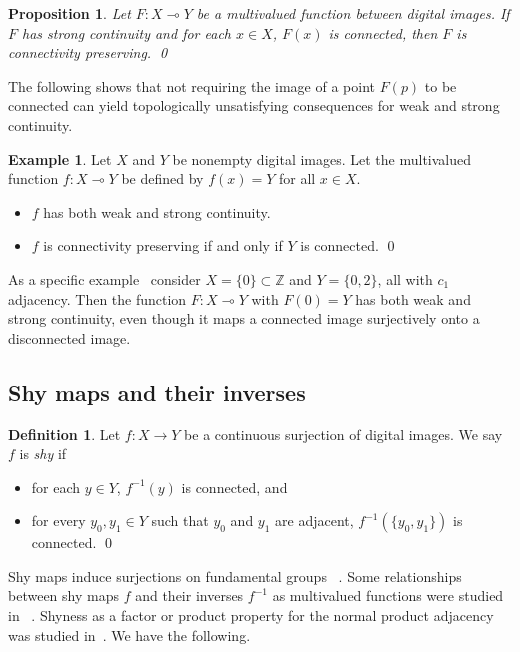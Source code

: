 \documentclass{article}
\theoremstyle{plain}
\newtheorem{prop}[thm]{Proposition}
\theoremstyle{definition}
\newtheorem{definition}[thm]{Definition}
\newtheorem{exl}[thm]{Example}
\numberwithin{thm}{section}
\def\Z{{\mathbb Z}}
\begin{document}
\begin{prop}
\rm{\cite{BoxSta16}}
Let $F: X \multimap Y$ be a multivalued function between
digital images. If $F$ has strong continuity and for
each $x \in X$, $F(x)$ is connected, then $F$ is
connectivity preserving. \qed
\end{prop}

The following shows that not requiring the image of a
point $F(p)$ to be connected can yield topologically unsatisfying 
consequences for weak and strong continuity.

\begin{exl}
\rm{\cite{BoxSta16}}
Let $X$ and $Y$ be nonempty digital images. Let
the multivalued function $f: X \multimap Y$ be defined by
$f(x)=Y$ for all $x \in X$.
\begin{itemize}
\item $f$ has both weak and strong continuity.
\item $f$ is connectivity preserving if and only if $Y$ is
      connected. \qed
\end{itemize}
\end{exl}

As a specific example~\cite{BoxSta16} consider $X= \{0\} \subset \Z$ and $Y = \{0,2\}$, all with $c_1$ adjacency. Then the function $F:X \multimap Y$ with $F(0) = Y$ has both weak and strong continuity, even though it maps a connected image surjectively onto a disconnected image.

\subsection{Shy maps and their inverses}
\begin{definition}
\label{shy-def}
\cite{Boxer05}
Let $f: X \rightarrow Y$ be a
continuous surjection of digital images. We say $f$ is
{\em shy} if
\begin{itemize}
\item for each $y \in Y$, $f^{-1}(y)$ is connected, and
\item for every $y_0,y_1 \in Y$ such that $y_0$ and $y_1$ are
      adjacent, $f^{-1}(\{y_0,y_1\})$ is
      connected. \qed
\end{itemize}
\end{definition}

Shy maps induce surjections on fundamental groups
~\cite{Boxer05}.
Some relationships between shy maps $f$ and their inverses
$f^{-1}$ as multivalued functions were studied in
~\cite{Boxer14,BoxSta16,Boxer16}.
Shyness as a factor or product property for the normal product adjacency was studied in~\cite{Boxer16a}.
We have the following.
\end{document}
